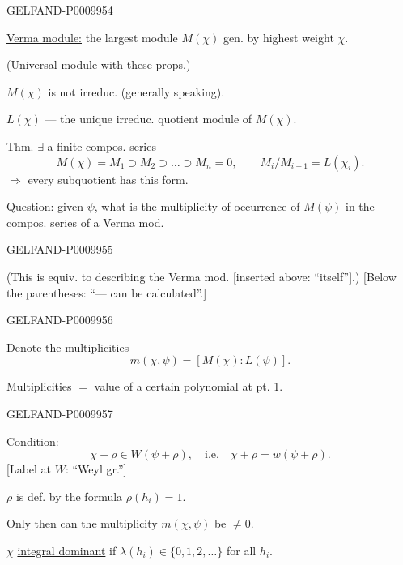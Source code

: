 \begin{GelfandAdjacentEvidence}{GELFAND-P000995}{4}


\underline{Verma module:} the largest module $M(\chi)$ gen. by highest weight $\chi$.

(Universal module with these props.)

$M(\chi)$ is not irreduc. (generally speaking).

$L(\chi)$ --- the unique irreduc. quotient module of $M(\chi)$.

\underline{Thm.} $\exists$ a finite compos. series
\[
M(\chi)=M_1\supset M_2\supset\ldots\supset M_n=0,
\qquad M_i/M_{i+1}=L(\chi_i).
\]
$\Rightarrow$ every subquotient has this form.

\underline{Question:} given $\psi$, what is the multiplicity of occurrence of $M(\psi)$ in the compos. series of a Verma mod.
\end{GelfandAdjacentEvidence}
\begin{GelfandAdjacentEvidence}{GELFAND-P000995}{5}


(This is equiv. to describing the Verma mod. [inserted above: “itself”].)
[Below the parentheses: “--- can be calculated”.]
\end{GelfandAdjacentEvidence}
\begin{GelfandAdjacentEvidence}{GELFAND-P000995}{6}


Denote the multiplicities
\[
m(\chi,\psi)=[M(\chi):L(\psi)].
\]

Multiplicities $=$ value of a certain polynomial at pt. 1.
\end{GelfandAdjacentEvidence}
\begin{GelfandAdjacentEvidence}{GELFAND-P000995}{7}


\underline{Condition:}
\[
\chi+\rho\in W(\psi+\rho),\quad
\text{i.e.}\quad \chi+\rho=w(\psi+\rho).
\]
[Label at $W$: “Weyl gr.”]

$\rho$ is def. by the formula $\rho(h_i)=1$.

Only then can the multiplicity $m(\chi,\psi)$ be $\ne0$.

$\chi$ \underline{integral dominant} if $\lambda(h_i)\in\{0,1,2,\ldots\}$ for all $h_i$.
\end{GelfandAdjacentEvidence}



